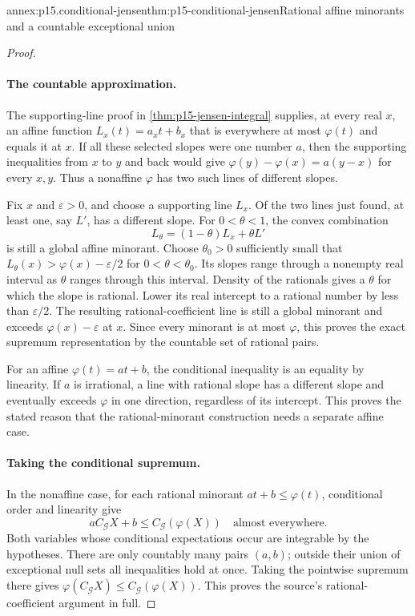 \begin{annexitem}{annex:p15.conditional-jensen}{thm:p15-conditional-jensen}{Rational affine minorants and a countable exceptional union}
\begin{proof}
\paragraph{The countable approximation.}
The supporting-line proof in \cref{thm:p15-jensen-integral} supplies,
at every real \(x\), an affine function \(L_x(t)=a_xt+b_x\) that
is everywhere at most \(\varphi(t)\) and equals it at \(x\).
If all these selected slopes were one number \(a\), then the
supporting inequalities from \(x\) to \(y\) and back would give
\(\varphi(y)-\varphi(x)=a(y-x)\) for every \(x,y\).
Thus a nonaffine \(\varphi\) has two such lines of different slopes.

Fix \(x\) and \(\varepsilon>0\), and choose a supporting line \(L_x\).
Of the two lines just found, at least one, say \(L'\), has a
different slope. For \(0<\theta<1\), the convex combination
\[
                             L_\theta=(1-\theta)L_x+\theta L'
\]
is still a global affine minorant.
Choose \(\theta_0>0\) sufficiently small that
\(L_\theta(x)>\varphi(x)-\varepsilon/2\) for \(0<\theta<\theta_0\).
Its slopes range through a nonempty real interval as \(\theta\)
ranges through this interval. Density of the rationals gives a
\(\theta\) for which the slope is rational.
Lower its real intercept to a rational number by less than
\(\varepsilon/2\). The resulting rational-coefficient line is still
a global minorant and exceeds \(\varphi(x)-\varepsilon\) at \(x\).
Since every minorant is at most \(\varphi\), this proves the exact
supremum representation by the countable set of rational pairs.

For an affine \(\varphi(t)=at+b\), the conditional inequality is
an equality by linearity. If \(a\) is irrational, a line with rational
slope has a different slope and eventually exceeds \(\varphi\) in
one direction, regardless of its intercept. This proves the stated
reason that the rational-minorant construction needs a separate affine case.

\paragraph{Taking the conditional supremum.}
In the nonaffine case, for each rational minorant \(at+b\leq\varphi(t)\),
conditional order and linearity give
\[
                  aC_{\mathcal G}X+b
                       \leq C_{\mathcal G}(\varphi(X))
                             \quad\text{almost everywhere}.
\]
Both variables whose conditional expectations occur are integrable
by the hypotheses. There are only countably many pairs \((a,b)\);
outside their union of exceptional null sets all inequalities hold
at once. Taking the pointwise supremum there gives
\(\varphi(C_{\mathcal G}X)\leq C_{\mathcal G}(\varphi(X))\).
This proves the source's rational-coefficient argument in full.
\end{proof}
\end{annexitem}

